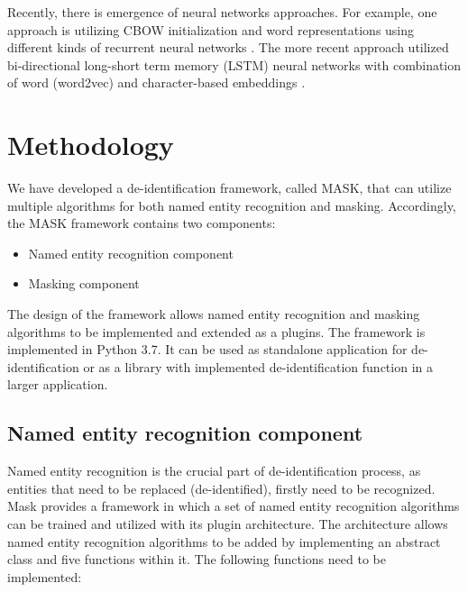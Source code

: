 \documentclass[a4paper,twoside]{article}
\begin{document}
Recently, there is emergence of neural networks approaches. For example, one approach is utilizing CBOW initialization and word representations using different kinds of recurrent neural networks \cite{yadav2016deep}. The more recent approach utilized bi-directional long-short term memory (LSTM) neural networks with combination of word (word2vec) and character-based embeddings \cite{dernoncourt2017identification}.

\section{Methodology}

We have developed a de-identification framework, called MASK, that can utilize multiple algorithms for both named entity recognition and masking. Accordingly, the MASK framework contains two components:
\begin{itemize}
\item Named entity recognition component
\item Masking component
\end{itemize}
The design of the framework allows named entity recognition and masking algorithms to be implemented and extended as a plugins. The framework is implemented in Python 3.7. It can be used as standalone application for de-identification or as a library with implemented de-identification function in a larger application.


\subsection{Named entity recognition component}

Named entity recognition is the crucial part of de-identification process, as entities that need to be replaced (de-identified), firstly need to be recognized. Mask provides a framework in which a set of named entity recognition algorithms can be trained and utilized with its plugin architecture. The architecture allows named entity recognition algorithms to be added by implementing an abstract class and five functions within it. The following functions need to be implemented: 
\end{document}
